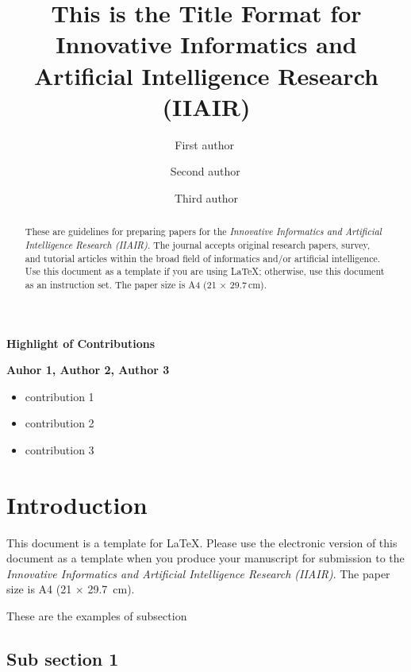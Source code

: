 \documentclass{iiair}
\title{This is the Title Format for Innovative Informatics and Artificial Intelligence Research (IIAIR)}
\author[1]{First author\,\orcidlink{0000-0000-0000-0000}\,}
\author[1]{Second author\,\orcidlink{0000-0000-0000-0000}}
\author[2]{Third author}
\affil[1]{Department, University, City,
    Country}
\affil[2]{Department, University, City}
\begin{document}
\thispagestyle{empty}
\begin{center}
    \huge\textbf{Highlight of Contributions}
\end{center}

\bigskip

\begin{minipage}{\textwidth}
\large \textbf{Auhor 1, Author 2, Author 3}
\begin{itemize}
\large
    \item contribution 1
    \item contribution 2
    \item contribution 3
\end{itemize}
\end{minipage}


\maketitle

\begin{abstract}
  These are guidelines for preparing papers for the \emph{Innovative Informatics and Artificial Intelligence Research (IIAIR)}. The journal accepts original research
  papers, survey, and tutorial articles within the broad field of informatics and/or artificial intelligence. Use this document as a template if you are using
  \LaTeX; otherwise, use this document as an
  instruction set. The paper size is A4 (21 × 29.7\,cm).  

\end{abstract}

\section{Introduction}


This document is a template for \LaTeX. 
Please use the electronic version of this document as a
template when you produce your manuscript for submission to the
\emph{Innovative Informatics and Artificial Intelligence Research (IIAIR)}. The paper size is A4 (21 × 29.7~cm).

These are the examples of subsection

\subsection{Sub section 1}
\end{document}
